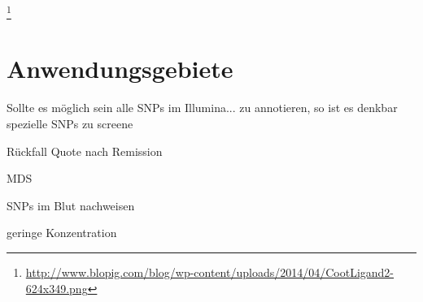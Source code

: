 \footnote{\url{http://www.blopig.com/blog/wp-content/uploads/2014/04/CootLigand2-624x349.png}}




\chapter{Anwendungsgebiete}

Sollte es möglich sein alle \ac{SNP}s im Illumina... zu annotieren, so ist es denkbar spezielle SNPs zu screene


Rückfall Quote nach Remission

MDS

SNPs im Blut nachweisen

geringe Konzentration



